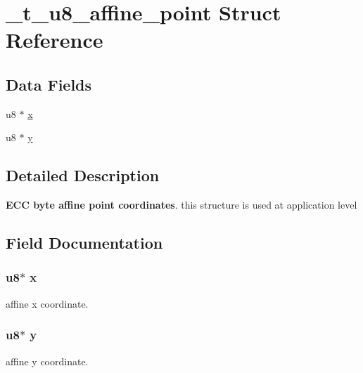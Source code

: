\hypertarget{struct__t__u8__affine__point}{\section{\+\_\+t\+\_\+u8\+\_\+affine\+\_\+point Struct Reference}
\label{struct__t__u8__affine__point}
}
\subsection*{Data Fields}
\begin{DoxyCompactItemize}
\item
u8 $\ast$ \hyperlink{struct__t__u8__affine__point_a491ceb5dc35f494dc4f3404d310efdce}{x}
\item
u8 $\ast$ \hyperlink{struct__t__u8__affine__point_a6e7899d61e302b5db66be4db664372b0}{y}
\end{DoxyCompactItemize}


\subsection{Detailed Description}
{\bfseries E\+C\+C byte affine point coordinates}. this structure is used at application level

\subsection{Field Documentation}
\hypertarget{struct__t__u8__affine__point_a491ceb5dc35f494dc4f3404d310efdce}{
\subsubsection[{x}]{\setlength{\rightskip}{0pt plus 5cm}u8$\ast$ x}}\label{struct__t__u8__affine__point_a491ceb5dc35f494dc4f3404d310efdce}
affine x coordinate. \hypertarget{struct__t__u8__affine__point_a6e7899d61e302b5db66be4db664372b0}{
\subsubsection[{y}]{\setlength{\rightskip}{0pt plus 5cm}u8$\ast$ y}}\label{struct__t__u8__affine__point_a6e7899d61e302b5db66be4db664372b0}
affine y coordinate. 